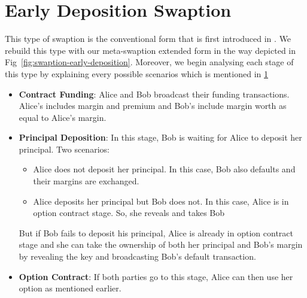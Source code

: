 \section{Early Deposition Swaption}
\label{app:conv-swaption}

This type of swaption is the conventional form that is first introduced in \cite{liu2018atomic}. We rebuild this type with our meta-swaption extended form in the way depicted in Fig~\ref{fig:swaption-early-deposition}. Moreover, we begin analysing each stage of this type by explaining every possible scenarios which is mentioned in \ref{app:conv-swaption}

\begin{itemize}
    \item \textbf{Contract Funding}: Alice and Bob broadcast their funding transactions. Alice's includes margin and premium and Bob's include margin worth as equal to Alice's margin.
    
    \item \textbf{Principal Deposition}: In this stage, Bob is waiting for Alice to deposit her principal. Two scenarios:
    \begin{itemize}
        \item Alice does not deposit her principal. In this case, Bob also defaults and their margins are exchanged.
        \item Alice deposits her principal but Bob does not. In this case, Alice is in option contract stage. So, she reveals \Atwo and takes Bob
    \end{itemize}
     But if Bob fails to deposit his principal, Alice is already in option contract stage and she can take the ownership of both her principal and Bob's margin by revealing the \Atwo key and broadcasting Bob's default transaction.
    
    \item \textbf{Option Contract}: If both parties go to this stage, Alice can then use her option as mentioned earlier.
\end{itemize}


